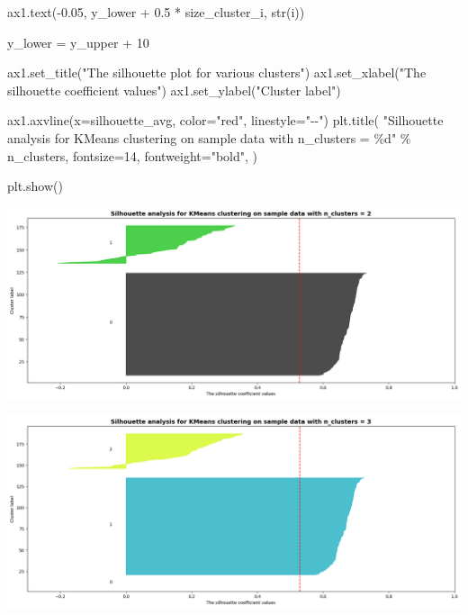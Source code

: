 \documentclass[
  11pt,
  letterpaper,
  DIV=11,
  numbers=noendperiod]{scrartcl}
\newenvironment{Shaded}{\begin{snugshade}}{\end{snugshade}}
\newcommand{\BuiltInTok}[1]{\textcolor[rgb]{0.00,0.23,0.31}{#1}}
\newcommand{\DecValTok}[1]{\textcolor[rgb]{0.68,0.00,0.00}{#1}}
\newcommand{\FloatTok}[1]{\textcolor[rgb]{0.68,0.00,0.00}{#1}}
\newcommand{\NormalTok}[1]{\textcolor[rgb]{0.00,0.23,0.31}{#1}}
\newcommand{\OperatorTok}[1]{\textcolor[rgb]{0.37,0.37,0.37}{#1}}
\newcommand{\SpecialCharTok}[1]{\textcolor[rgb]{0.37,0.37,0.37}{#1}}
\newcommand{\StringTok}[1]{\textcolor[rgb]{0.13,0.47,0.30}{#1}}
\begin{document}
\begin{Shaded}
\begin{Highlighting}[]
\NormalTok{        ax1.text(}\OperatorTok{{-}}\FloatTok{0.05}\NormalTok{, y\_lower }\OperatorTok{+} \FloatTok{0.5} \OperatorTok{*}\NormalTok{ size\_cluster\_i, }\BuiltInTok{str}\NormalTok{(i))}

\NormalTok{        y\_lower }\OperatorTok{=}\NormalTok{ y\_upper }\OperatorTok{+} \DecValTok{10}  

\NormalTok{    ax1.set\_title(}\StringTok{"The silhouette plot for various clusters"}\NormalTok{)}
\NormalTok{    ax1.set\_xlabel(}\StringTok{"The silhouette coefficient values"}\NormalTok{)}
\NormalTok{    ax1.set\_ylabel(}\StringTok{"Cluster label"}\NormalTok{)}

\NormalTok{    ax1.axvline(x}\OperatorTok{=}\NormalTok{silhouette\_avg, color}\OperatorTok{=}\StringTok{"red"}\NormalTok{, linestyle}\OperatorTok{=}\StringTok{"{-}{-}"}\NormalTok{)}
\NormalTok{    plt.title(}
        \StringTok{"Silhouette analysis for KMeans clustering on sample data with n\_clusters = }\SpecialCharTok{\%d}\StringTok{"}
        \OperatorTok{\%}\NormalTok{ n\_clusters,}
\NormalTok{        fontsize}\OperatorTok{=}\DecValTok{14}\NormalTok{,}
\NormalTok{        fontweight}\OperatorTok{=}\StringTok{"bold"}\NormalTok{,}
\NormalTok{    )}

\NormalTok{plt.show()}
\end{Highlighting}
\end{Shaded}

\includegraphics{Assignment6_Final version_files/figure-pdf/cell-21-output-1.png}

\includegraphics{Assignment6_Final version_files/figure-pdf/cell-21-output-2.png}
\end{document}
